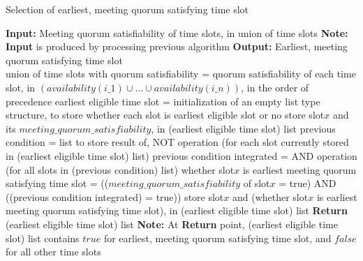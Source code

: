 \documentclass{article}
\begin{document}
\begin{algorithm}[H]
    \caption{Selection of earliest, meeting quorum satisfying time slot}
    \begin{algorithmic}
        \State \textbf{Input:} Meeting quorum satisfiability of time slots, in union of time slots
        \State \textbf{Note:} \textbf{Input} is produced by processing previous algorithm
        \State \textbf{Output:} Earliest, meeting quorum satisfying time slot \\
        \State union of time slots with quorum satisfiability = quorum satisfiability of each time slot, in \((availability(i\_1) \cup \dots \cup availability(i\_n))\), in the order of precedence
        \State earliest eligible time slot = initialization of an empty list type structure, to store whether each slot is earliest eligible slot or no
                \State store slot\(x\) and its \(meeting\_quorum\_satisfiability\), in (earliest eligible time slot) list     
            \Else
                \State previous condition = list to store result of, NOT operation (for each slot currently stored in (earliest eligible time slot) list)
                \State previous condition integrated = AND operation (for all slots in (previous condition) list) 
                \State whether slot\(x\) is earliest meeting quorum satisfying time slot = ((\(meeting\_quorum\_satisfiability\) of slot\(x\) = true) AND ((previous condition integrated) = true))
                \State store slot\(x\) and (whether slot\(x\) is earliest meeting quorum satisfying time slot), in (earliest eligible time slot) list                
            \EndIf
        \EndFor
        \State \textbf{Return} (earliest eligible time slot) list 
        \State \textbf{Note:} At \textbf{Return} point, (earliest eligible time slot) list contains \(true\) for earliest, meeting quorum satisfying time slot, and \(false\) for all other time slots
    \end{algorithmic}
\end{algorithm}
\end{document}
